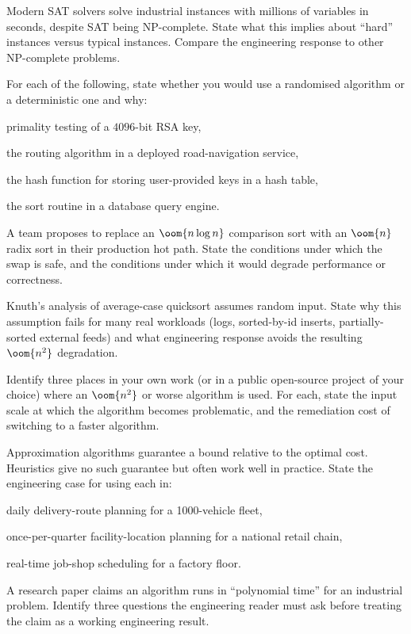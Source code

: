 \begin{exercise}
Modern SAT solvers solve industrial instances with millions of variables in seconds, despite SAT being NP-complete. State what this implies about ``hard'' instances versus typical instances. Compare the engineering response to other NP-complete problems.
\end{exercise}

\begin{exercise}
For each of the following, state whether you would use a randomised algorithm or a deterministic one and why: \begin{enumerate*}[label=(\alph*)] \item primality testing of a $4096$-bit RSA key, \item the routing algorithm in a deployed road-navigation service, \item the hash function for storing user-provided keys in a hash table, \item the sort routine in a database query engine. \end{enumerate*}
\end{exercise}

\begin{exercise}
A team proposes to replace an $\oom{n \log n}$ comparison sort with an $\oom{n}$ radix sort in their production hot path. State the conditions under which the swap is safe, and the conditions under which it would degrade performance or correctness.
\end{exercise}

\begin{exercise}
Knuth's analysis of average-case quicksort assumes random input. State why this assumption fails for many real workloads (logs, sorted-by-id inserts, partially-sorted external feeds) and what engineering response avoids the resulting $\oom{n^2}$ degradation.
\end{exercise}

\begin{exercise}
Identify three places in your own work (or in a public open-source project of your choice) where an $\oom{n^2}$ or worse algorithm is used. For each, state the input scale at which the algorithm becomes problematic, and the remediation cost of switching to a faster algorithm.
\end{exercise}

\begin{exercise}
Approximation algorithms guarantee a bound relative to the optimal cost. Heuristics give no such guarantee but often work well in practice. State the engineering case for using each in: \begin{enumerate*}[label=(\alph*)] \item daily delivery-route planning for a 1000-vehicle fleet, \item once-per-quarter facility-location planning for a national retail chain, \item real-time job-shop scheduling for a factory floor. \end{enumerate*}
\end{exercise}

\begin{exercise}
A research paper claims an algorithm runs in ``polynomial time'' for an industrial problem. Identify three questions the engineering reader must ask before treating the claim as a working engineering result.
\end{exercise}

